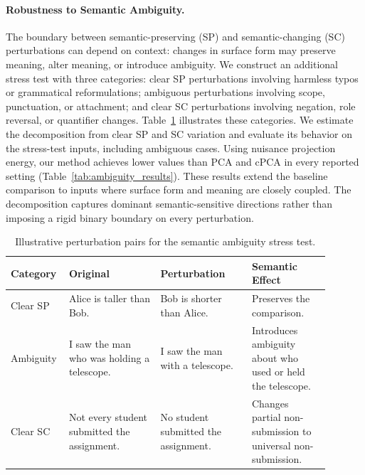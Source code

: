 \paragraph{Robustness to Semantic Ambiguity.}
The boundary between semantic-preserving (SP) and semantic-changing
(SC) perturbations can depend on context: changes in surface form
may preserve meaning, alter meaning, or introduce ambiguity.
We construct an additional stress test with three categories:
clear SP perturbations involving harmless typos or grammatical
reformulations; ambiguous perturbations involving scope,
punctuation, or attachment; and clear SC perturbations involving
negation, role reversal, or quantifier changes.
Table~\ref{tab:ambiguity_examples} illustrates these categories.
We estimate the decomposition from clear SP and SC variation
and evaluate its behavior on the stress-test inputs, including
ambiguous cases. Using nuisance projection energy, our method
achieves lower values than PCA and cPCA in every reported setting
(Table~\ref{tab:ambiguity_results}). These results extend the
baseline comparison to inputs where surface form and meaning
are closely coupled. The decomposition captures dominant
semantic-sensitive directions rather than imposing a rigid
binary boundary on every perturbation.

\begin{table}[t]
\centering
\small
\renewcommand{\arraystretch}{1.15}
\caption{Illustrative perturbation pairs for the semantic
ambiguity stress test.}
\label{tab:ambiguity_examples}
\begin{tabular}{p{0.12\linewidth} p{0.27\linewidth}
                p{0.27\linewidth} p{0.23\linewidth}}
\toprule
Category & Original & Perturbation & Semantic Effect \\
\midrule
Clear SP
& Alice is taller than Bob.
& Bob is shorter than Alice.
& Preserves the comparison. \\
\addlinespace
Ambiguity
& I saw the man who was holding a telescope.
& I saw the man with a telescope.
& Introduces ambiguity about who used or held the telescope. \\
\addlinespace
Clear SC
& Not every student submitted the assignment.
& No student submitted the assignment.
& Changes partial non-submission to universal non-submission. \\
\bottomrule
\end{tabular}
\end{table}

